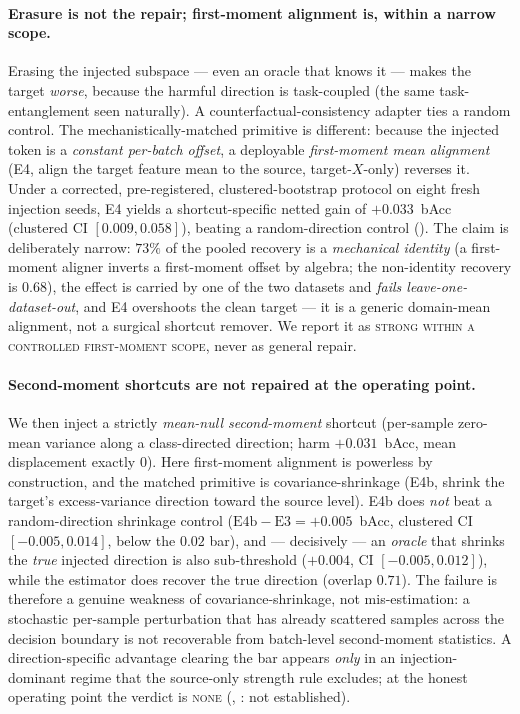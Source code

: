 \paragraph{Erasure is not the repair; first-moment alignment is, within a narrow scope.} Erasing the injected
subspace --- even an oracle that knows it --- makes the target \emph{worse}, because the harmful direction is
task-coupled (the same task-entanglement seen naturally). A counterfactual-consistency adapter ties a random
control. The mechanistically-matched primitive is different: because the injected token is a \emph{constant
per-batch offset}, a deployable \emph{first-moment mean alignment} (E4, align the target feature mean to the
source, target-$X$-only) reverses it. Under a corrected, pre-registered, clustered-bootstrap protocol on eight
fresh injection seeds, E4 yields a shortcut-specific netted gain of $+0.033$~bAcc (clustered CI $[0.009,0.058]$),
beating a random-direction control (). The claim is deliberately narrow: $73\%$ of the pooled recovery
is a \emph{mechanical identity} (a first-moment aligner inverts a first-moment offset by algebra; the
non-identity recovery is $0.68$), the effect is carried by one of the two datasets and \emph{fails
leave-one-dataset-out}, and E4 overshoots the clean target --- it is a generic domain-mean alignment, not a
surgical shortcut remover. We report it as \textsc{strong within a controlled first-moment scope}, never as
general repair.

\paragraph{Second-moment shortcuts are not repaired at the operating point.} We then inject a strictly
\emph{mean-null second-moment} shortcut (per-sample zero-mean variance along a class-directed direction; harm
$+0.031$~bAcc, mean displacement exactly $0$). Here first-moment alignment is powerless by construction, and the
matched primitive is covariance-shrinkage (E4b, shrink the target's excess-variance direction toward the source
level). E4b does \emph{not} beat a random-direction shrinkage control ($\text{E4b}-\text{E3}={+}0.005$~bAcc,
clustered CI $[-0.005,0.014]$, below the $0.02$ bar), and --- decisively --- an \emph{oracle} that shrinks the
\emph{true} injected direction is also sub-threshold ($+0.004$, CI $[-0.005,0.012]$), while the estimator does
recover the true direction (overlap $0.71$). The failure is therefore a genuine weakness of covariance-shrinkage,
not mis-estimation: a stochastic per-sample perturbation that has already scattered samples across the decision
boundary is not recoverable from batch-level second-moment statistics. A direction-specific advantage clearing
the bar appears \emph{only} in an injection-dominant regime that the source-only strength rule excludes; at the
honest operating point the verdict is \textsc{none} (, : not established).

